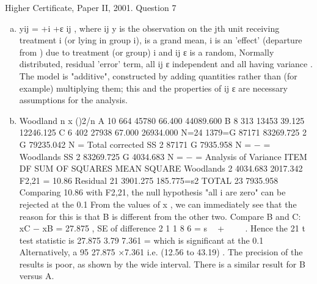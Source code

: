 \documentclass[a4paper,12pt]{article}
\begin{document}

Higher Certificate, Paper II, 2001. Question 7
\begin{enumerate}[(a)]
\item  yij = \mu +\alpha i +ε ij , where ij y is the observation on the jth unit receiving
treatment i (or lying in group i), \mu is a grand mean, i
\alpha  is an 'effect' (departure from
\mu ) due to treatment (or group) i and ij ε is a random, Normally distributed, residual
'error' term, all { } ij ε independent and all having variance  .
The model is "additive", constructed by adding quantities rather than (for example)
multiplying them; this and the properties of { } ij ε are necessary assumptions for the
analysis.
\item
Woodland n \sigmax {} x (\sigmax)2/n
A 10 664 45780 66.400 44089.600
B 8 313 13453 39.125 12246.125
C 6 402 27938 67.000 26934.000
N=24 1379=G 87171 83269.725
2
G 79235.042
N
=
Total corrected SS
2
87171 G 7935.958
N
= − =
Woodlands SS
2
83269.725 G 4034.683
N
= − =
Analysis of Variance
ITEM DF SUM OF SQUARES MEAN SQUARE
Woodlands 2 4034.683 2017.342 F2,21 = 10.86
Residual 21 3901.275 185.775=s2
TOTAL 23 7935.958
Comparing 10.86 with F2,21, the null hypothesis "all i
\alpha  are zero" can be rejected at
the 0.1%
From the values of x , we can immediately see that the reason for this is that B is
different from the other two.
Compare B and C:
xC − xB = 27.875 , SE of difference 2 1 1
8 6
= s  + 
 
.
Hence the 21 t test statistic is 27.875 3.79
7.361
= which is significant at the 0.1%
Alternatively, a 95%
27.875 ×7.361 i.e. (12.56 to 43.19) .
The precision of the results is poor, as shown by the wide interval.
There is a similar result for B versus A.
\end{enumerate}
\end{document}
